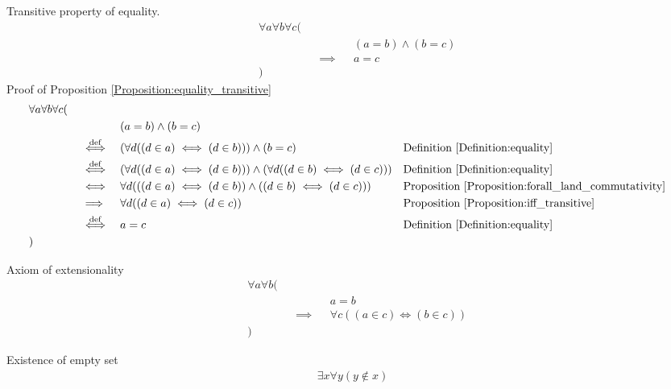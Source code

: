 \begin{prop}
\label{Proposition:equality_transitive}
Transitive property of equality.
\begin{align*}
& \forall a \forall b \forall c ( \\
& \quad && && (a = b) \land (b = c) \\
& \quad && \implies && a = c \\
& )
\end{align*}
Proof of Proposition \ref{Proposition:equality_transitive}
\begin{align*}
& \forall a \forall b \forall c ( \\
& \quad && && (a = b) \land (b = c) \\
& \quad && \overset{\operatorname{def}}{\iff} && (\forall d ((d \in a) \iff (d \in b))) \land (b = c)
&& \text{Definition \ref{Definition:equality}} \\
& \quad && \overset{\operatorname{def}}{\iff} && (\forall d ((d \in a) \iff (d \in b))) \land (\forall d ((d \in b) \iff (d \in c)))
&& \text{Definition \ref{Definition:equality}} \\
& \quad && \iff && \forall d (((d \in a) \iff (d \in b)) \land ((d \in b) \iff (d \in c)))
&& \text{Proposition \ref{Proposition:forall_land_commutativity}} \\
& \quad && \implies && \forall d ((d \in a) \iff (d \in c))
&& \text{Proposition \ref{Proposition:iff_transitive}} \\
& \quad && \overset{\operatorname{def}}{\iff} && a = c
&& \text{Definition \ref{Definition:equality}} \\
& )
\end{align*}
\end{prop}

\begin{axm}
\label{Axiom:extensionality}
Axiom of extensionality
\begin{align*}
& \forall a \forall b ( \\
& \quad && && a = b \\
& \quad && \implies && \forall c ((a \in c) \iff (b \in c)) \\
& )
\end{align*}
\end{axm}

\begin{axm}
\label{Axiom:existence_of_empty_set}
Existence of empty set
\begin{align*}
\exists x \forall y (y \notin x)
\end{align*}
\end{axm}

